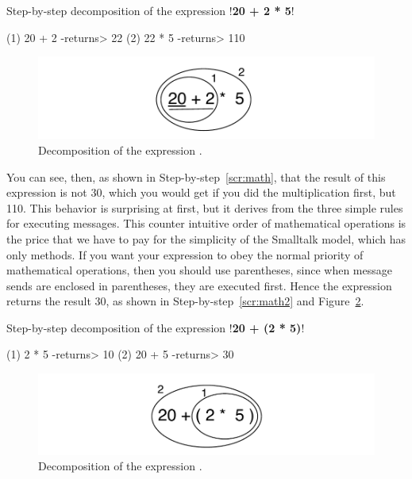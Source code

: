 \documentclass[a4paper,10pt,twoside]{book}
\begin{document}
\begin{script}[math]{Step-by-step decomposition of the expression }
!\textbf{20 + 2 * 5}!
  
(1)  20 + 2
  -returns> 22
(2)  22 * 5
   -returns> 110
\end{script}


\begin{figure}[h]
	\centerline{\includegraphics[width=\linewidth]{ucompoNoBracket}}
	\caption{Decomposition of the expression .\label{fig:ucompoNoBracket}}
\end{figure}



You can see, then, as shown in Step-by-step~\ref{scr:math}, that the result of this expression is not 
30, which you would get if you did the multiplication first, but 110. This behavior is surprising 
at first, but it derives from the three simple rules for executing messages. This counter intuitive 
order of mathematical operations is the price that we have to pay for the simplicity of the 
Smalltalk model, which has only methods. If you want your expression to obey the normal 
priority of mathematical operations, then you should use parentheses, since when message 
sends are enclosed in parentheses, they are executed first. Hence the expression  
returns the result 30, as shown in Step-by-step~\ref{scr:math2} and Figure~\ref{fig:ucompoNumberBracket}. 

\begin{script}[math2]{Step-by-step decomposition of the expression }
!\textbf{20 + (2 * 5)}!
  
(1)  2 * 5
  -returns> 10
(2)  20 + 5
   -returns> 30
\end{script}


\begin{figure}[h]
	\centerline{\includegraphics[width=\linewidth]{ucompoNumberBracket}}
	\caption{Decomposition of the expression .\label{fig:ucompoNumberBracket}}
\end{figure}
\end{document}
